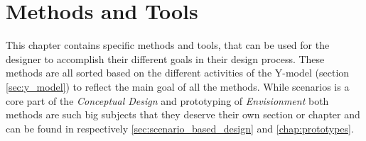 \chapter{Methods and Tools} \label{chap:methods}
This chapter contains specific methods and tools, that can be used for the designer to accomplish their different goals in their design process. These methods are all sorted based on the different activities of the Y-model (section \ref{sec:y_model}) to reflect the main goal of all the methods. While scenarios is a core part of the \emph{Conceptual Design} and prototyping of \emph{Envisionment} both methods are such big subjects that they deserve their own section or chapter and can be found in respectively \ref{sec:scenario_based_design} and \ref{chap:prototypes}.

\vfill \minitoc \newpage






